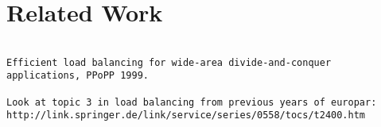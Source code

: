 \section{Related Work}

\begin{verbatim}

Efficient load balancing for wide-area divide-and-conquer
applications, PPoPP 1999.

Look at topic 3 in load balancing from previous years of europar:
http://link.springer.de/link/service/series/0558/tocs/t2400.htm

\end{verbatim}